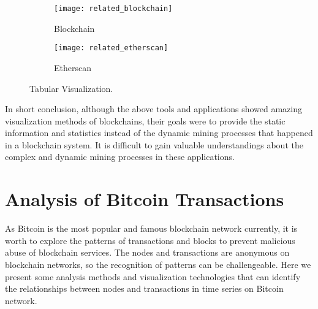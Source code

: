 \begin{figure}[htb]
    \centering
    \begin{subfigure}[b]{1\textwidth}
        \centering
        \texttt{[image: related\_blockchain]}
        \caption{Blockchain}
    \end{subfigure}

    \begin{subfigure}[b]{1\textwidth}
        \centering
        \texttt{[image: related\_etherscan]}
        \caption{Etherscan}
    \end{subfigure}

    \caption{Tabular Visualization.}
    \label{fig:tabular visualization}
\end{figure}

In short conclusion, although the above tools and applications showed amazing visualization methods of blockchains, their goals were to provide the static information and statistics instead of the dynamic mining processes that happened in a blockchain system. It is difficult to gain valuable understandings about the complex and dynamic mining processes in these applications.

\section{Analysis of Bitcoin Transactions}

As Bitcoin is the most popular and famous blockchain network currently, it is worth to explore the patterns of transactions and blocks to prevent malicious abuse of blockchain services. The nodes and transactions are anonymous on blockchain networks, so the recognition of patterns can be challengeable. Here we present some analysis methods and visualization technologies that can identify the relationships between nodes and transactions in time series on Bitcoin network.

